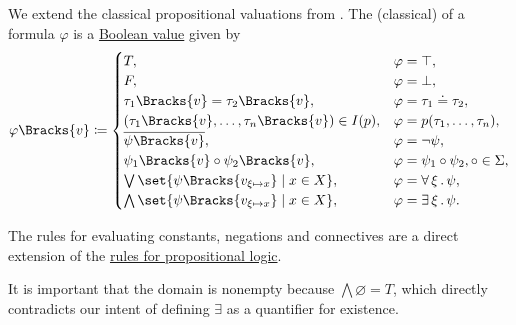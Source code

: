 \begin{definition}
\begin{thmenum}
     We extend the classical propositional valuations from . The (classical)  of a formula \( \varphi \) is a \hyperref[def:boolean_value]{Boolean value} given by
    \begin{equation}\label{eq:def:first_order_valuation/formula_valuation}
      \varphi\Bracks{v} \coloneqq \begin{cases}
        T,                                                                   &\varphi = \top, \\
        F,                                                                   &\varphi = \bot, \\
        \tau_1\Bracks{v} = \tau_2\Bracks{v},                                 &\varphi = \tau_1 \doteq \tau_2, \\
        (\tau_1\Bracks{v}, \ldots, \tau_n\Bracks{v}) \in I(p),               &\varphi = p(\tau_1, \ldots, \tau_n), \\
        \overline{\psi\Bracks{v}},                                           &\varphi = \neg \psi, \\
        \psi_1\Bracks{v} \bincirc \psi_2\Bracks{v},                          &\varphi = \psi_1 \bincirc \psi_2, \bincirc \in \Sigma, \\
        \bigvee\set{ \psi\Bracks{v_{\xi \mapsto x}} \given x \in X },   &\varphi = \qforall \xi \psi, \\
        \bigwedge\set{ \psi\Bracks{v_{\xi \mapsto x}} \given x \in X }, &\varphi = \qexists \xi \psi.
      \end{cases}
    \end{equation}

    The rules for evaluating constants, negations and connectives are a direct extension of the \hyperref[def:propositional_valuation/formula_valuation]{rules for propositional logic}.

    It is important that the domain is nonempty because \( \bigwedge\varnothing = T \), which directly contradicts our intent of defining \( \exists \) as a quantifier for existence.
  \end{thmenum}
\end{definition}


